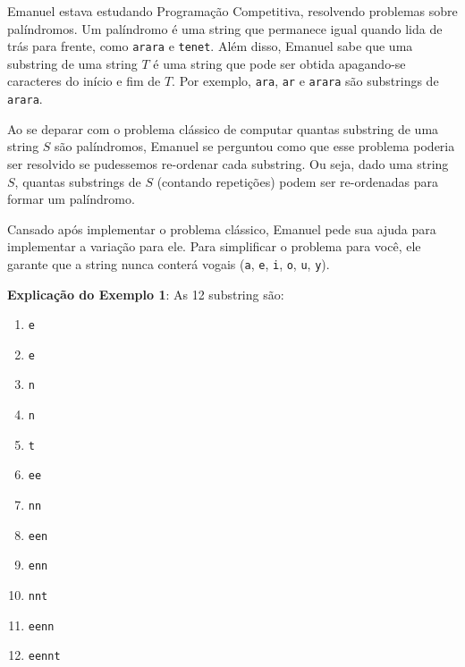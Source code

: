 %

Emanuel estava estudando Programação Competitiva, resolvendo problemas sobre palíndromos. Um palíndromo é uma string que permanece igual quando lida de trás para frente, como {\tt arara} e {\tt tenet}. Além disso, Emanuel sabe que uma substring de uma string $T$ é uma string que pode ser obtida apagando-se caracteres do início e fim de $T$. Por exemplo, {\tt ara}, {\tt ar} e {\tt arara} são substrings de {\tt arara}.

Ao se deparar com o problema clássico de computar quantas substring de uma string $S$ são palíndromos, Emanuel se perguntou como que esse problema poderia ser resolvido se pudessemos re-ordenar cada substring. Ou seja, dado uma string $S$, quantas substrings de $S$ (contando repetições) podem ser re-ordenadas para formar um palíndromo.

Cansado após implementar o problema clássico, Emanuel pede sua ajuda para implementar a variação para ele. Para simplificar o problema para você, ele garante que a string nunca conterá vogais ({\tt a}, {\tt e}, {\tt i}, {\tt o}, {\tt u}, {\tt y}).

%
%

%
%



\sampleio

\bigskip
\textbf{Explicação do Exemplo 1}: As 12 substring são:

\begin{multicols}{2}
\begin{enumerate}
	\item {\tt e}
	\item {\tt e}
	\item {\tt n}
	\item {\tt n}
	\item {\tt t}
	\item {\tt ee}
	\item {\tt nn}
	\item {\tt een}
	\item {\tt enn}
	\item {\tt nnt}
	\item {\tt eenn}
	\item {\tt eennt}
\end{enumerate}
\end{multicols}
